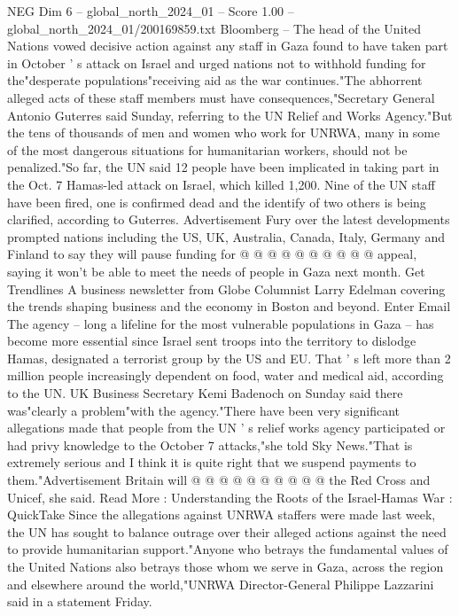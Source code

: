 \begin{textsample}{NEG Dim 6 – global\_north\_2024\_01 – Score 1.00 – global\_north\_2024\_01/200169859.txt}  \label{ex:f6_neg_332}
Bloomberg -- The head of the United Nations vowed decisive action against any staff in Gaza found to have taken part in October ' s attack on Israel and urged nations not to withhold funding for the"desperate populations"receiving aid as the war continues."The abhorrent alleged acts of these staff members must have consequences,"Secretary General Antonio Guterres said Sunday, referring to the UN Relief and Works Agency."But the tens of thousands of men and women who work for UNRWA, many in some of the most dangerous situations for humanitarian workers, should not be penalized."So far, the UN said 12 people have been implicated in taking part in the Oct. 7 Hamas-led attack on Israel, which killed 1,200.
Nine of the UN staff have been fired, one is confirmed dead and the identify of two others is being clarified, according to Guterres.
Advertisement Fury over the latest developments prompted nations including the US, UK, Australia, Canada, Italy, Germany and Finland to say they will pause funding for @ @ @ @ @ @ @ @ @ @ appeal, saying it won't be able to meet the needs of people in Gaza next month.
Get Trendlines A business newsletter from Globe Columnist Larry Edelman covering the trends shaping business and the economy in Boston and beyond.
Enter Email The agency -- long a lifeline for the most vulnerable populations in Gaza -- has become more essential since Israel sent troops into the territory to dislodge Hamas, designated a terrorist group by the US and EU.
That ' s left more than 2 million people increasingly dependent on food, water and medical aid, according to the UN.
UK Business Secretary Kemi Badenoch on Sunday said there was"clearly a problem"with the agency."There have been very significant allegations made that people from the UN ' s relief works agency participated or had privy knowledge to the October 7 attacks,"she told Sky News."That is extremely serious and I think it is quite right that we suspend payments to them."Advertisement Britain will @ @ @ @ @ @ @ @ @ @ the Red Cross and Unicef, she said.
Read More : Understanding the Roots of the Israel-Hamas War : QuickTake Since the allegations against UNRWA staffers were made last week, the UN has sought to balance outrage over their alleged actions against the need to provide humanitarian support."Anyone who betrays the fundamental values of the United Nations also betrays those whom we serve in Gaza, across the region and elsewhere around the world,"UNRWA Director-General Philippe Lazzarini said in a statement Friday.

\end{textsample}
